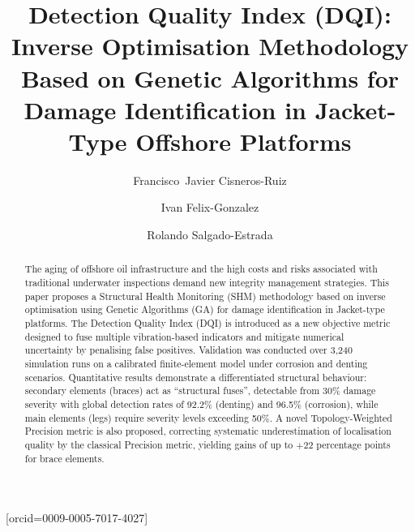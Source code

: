 \documentclass[a4paper,fleqn,nologo]{cas-dc}
\begin{document}
\let\WriteBookmarks\relax
\def\floatpagepagefraction{1}
\def\textpagefraction{.001}


\title[mode = title]{%
  Detection Quality Index (DQI): Inverse Optimisation Methodology
  Based on Genetic Algorithms for Damage Identification
  in Jacket-Type Offshore Platforms}

\author[1]{Francisco~Javier Cisneros-Ruiz}[orcid=0009-0005-7017-4027]
\cormark[1]

\author[2]{Ivan Felix-Gonzalez}

\author[3]{Rolando Salgado-Estrada}


\begin{abstract}
The aging of offshore oil infrastructure and the high costs and risks
associated with traditional underwater inspections demand new integrity
management strategies. This paper proposes a Structural Health Monitoring
(SHM) methodology based on inverse optimisation using Genetic Algorithms
(GA) for damage identification in Jacket-type platforms. The Detection
Quality Index (DQI) is introduced as a new objective metric designed to
fuse multiple vibration-based indicators and mitigate numerical uncertainty by
penalising false positives. Validation was conducted over 3{,}240
simulation runs on a calibrated finite-element model under corrosion and
denting scenarios. Quantitative results demonstrate a differentiated
structural behaviour: secondary elements (braces) act as ``structural
fuses'', detectable from 30\% damage severity with global detection rates
of 92.2\% (denting) and 96.5\% (corrosion), while main elements (legs)
require severity levels exceeding 50\%. A novel Topology-Weighted
Precision metric is also proposed, correcting systematic underestimation
of localisation quality by the classical Precision metric, yielding gains
of up to $+$22 percentage points for brace elements.
\end{abstract}
\end{document}
